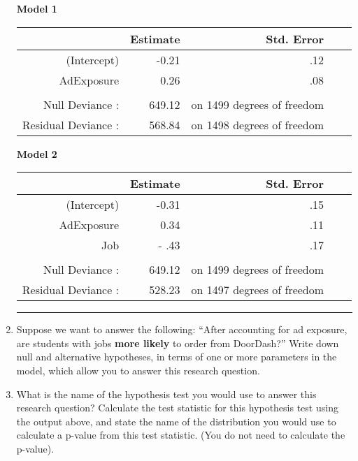 \documentclass[11pt]{article}
\begin{document}
\begin{enumerate}
\textbf{Model 1} 

\begin{center}
\begin{tabular}{rrrrr}
  \hline
             & Estimate & Std. Error \\
  \hline
(Intercept)    & -0.21 & .12    \\
 AdExposure    & 0.26 & .08 \\
  \hline
  & & \\ 
  Null Deviance : & 649.12 &  on 1499 degrees of freedom \\
  Residual Deviance : & 568.84 &   on 1498 degrees of freedom \\
\end{tabular}
\end{center}

\textbf{Model 2} 

\begin{center}
\begin{tabular}{rrrrr}
  \hline
             & Estimate & Std. Error \\
  \hline
(Intercept)    & -0.31 & .15    \\
 AdExposure    & 0.34 & .11 \\
 Job           & - .43 & .17 \\ 
  \hline
  & & \\ 
  Null Deviance : & 649.12 &  on 1499 degrees of freedom \\
  Residual Deviance : & 528.23 &   on 1497 degrees of freedom \\
\end{tabular}
\end{center}

\rule{\textwidth}{1pt}

\item Suppose we want to answer the following: ``After accounting for ad exposure, are students with jobs \textbf{more likely} to order from DoorDash?'' Write down null and alternative hypotheses, in terms of one or more parameters in the model, which allow you to answer this research question.

\vspace{3cm}

\item What is the name of the hypothesis test you would use to answer this research question? Calculate the test statistic for this hypothesis test using the output above, and state the name of the distribution you would use to calculate a p-value from this test statistic. (You do not need to calculate the p-value).




\end{enumerate}
\end{document}
